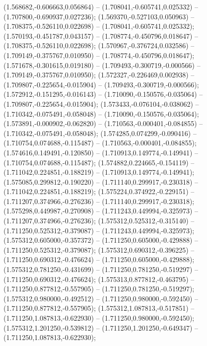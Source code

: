  (1.568682,-0.606663,0.056864) -- (1.708041,-0.605741,0.025332) -- (1.707800,-0.690937,0.027236);
 (1.569370,-0.527103,0.050963) -- (1.708375,-0.526110,0.022698) -- (1.708041,-0.605741,0.025332);
 (1.570193,-0.451787,0.043157) -- (1.708774,-0.450796,0.018647) -- (1.708375,-0.526110,0.022698);
 (1.570967,-0.376724,0.032586) -- (1.709149,-0.375767,0.010950) -- (1.708774,-0.450796,0.018647);
 (1.571678,-0.301615,0.019180) -- (1.709493,-0.300719,-0.000566) -- (1.709149,-0.375767,0.010950);
 (1.572327,-0.226469,0.002938) -- (1.709807,-0.225654,-0.015904) -- (1.709493,-0.300719,-0.000566);
 (1.572912,-0.151295,-0.016143) -- (1.710090,-0.150576,-0.035064) -- (1.709807,-0.225654,-0.015904);
 (1.573433,-0.076104,-0.038062) -- (1.710342,-0.075491,-0.058048) -- (1.710090,-0.150576,-0.035064);
 (1.573891,-0.000902,-0.062820) -- (1.710563,-0.000401,-0.084855) -- (1.710342,-0.075491,-0.058048);
 (1.574285,0.074299,-0.090416) -- (1.710754,0.074688,-0.115487) -- (1.710563,-0.000401,-0.084855);
 (1.574616,0.149491,-0.120850) -- (1.710913,0.149774,-0.149941) -- (1.710754,0.074688,-0.115487);
 (1.574882,0.224665,-0.154119) -- (1.711042,0.224851,-0.188219) -- (1.710913,0.149774,-0.149941);
 (1.575085,0.299812,-0.190220) -- (1.711140,0.299917,-0.230318) -- (1.711042,0.224851,-0.188219);
 (1.575224,0.374922,-0.229151) -- (1.711207,0.374966,-0.276236) -- (1.711140,0.299917,-0.230318);
 (1.575298,0.449987,-0.270908) -- (1.711243,0.449994,-0.325973) -- (1.711207,0.374966,-0.276236);
 (1.575312,0.525312,-0.315140) -- (1.711250,0.525312,-0.379087) -- (1.711243,0.449994,-0.325973);
 (1.575312,0.605000,-0.357372) -- (1.711250,0.605000,-0.429888) -- (1.711250,0.525312,-0.379087);
 (1.575312,0.690312,-0.396225) -- (1.711250,0.690312,-0.476624) -- (1.711250,0.605000,-0.429888);
 (1.575312,0.781250,-0.431699) -- (1.711250,0.781250,-0.519297) -- (1.711250,0.690312,-0.476624);
 (1.575313,0.877812,-0.463795) -- (1.711250,0.877812,-0.557905) -- (1.711250,0.781250,-0.519297);
 (1.575312,0.980000,-0.492512) -- (1.711250,0.980000,-0.592450) -- (1.711250,0.877812,-0.557905);
 (1.575312,1.087813,-0.517851) -- (1.711250,1.087813,-0.622930) -- (1.711250,0.980000,-0.592450);
 (1.575312,1.201250,-0.539812) -- (1.711250,1.201250,-0.649347) -- (1.711250,1.087813,-0.622930);
